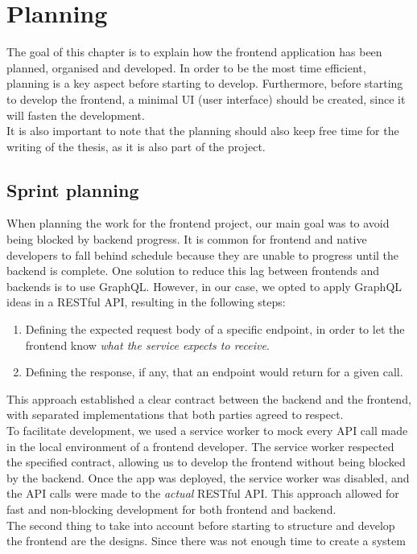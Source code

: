 \documentclass[../memory.tex]{subfiles}
\begin{document}
\chapter{Planning}
The goal of this chapter is to explain how the frontend application has been
planned, organised and developed. In order to be the most time efficient,
planning is a key aspect before starting to develop. Furthermore, before
starting to develop the frontend, a minimal UI (user interface) should be
created, since it will fasten the development.
\\
It is also important to note that the planning should also keep free time for
the writing of the thesis, as it is also part of the project.
\section{Sprint planning}
When planning the work for the frontend project, our main goal was to avoid
being blocked by backend progress. It is common for frontend and native
developers to fall behind schedule because they are unable to progress until the
backend is complete. One solution to reduce this lag between frontends and
backends is to use GraphQL. However, in our case, we opted to apply GraphQL
ideas in a RESTful API, resulting in the following steps:
\begin{enumerate}[label = -]
	\item Defining the expected request body of a specific endpoint, in order to
	      let the frontend know \emph{what the service expects to receive}.
	\item Defining the response, if any, that an endpoint would return for a given call.
\end{enumerate}
This approach established a clear contract between the backend and the frontend,
with separated implementations that both parties agreed to respect.
\\
To facilitate development, we used a service worker to mock every API call made
in the local environment of a frontend developer. The service worker respected
the specified contract, allowing us to develop the frontend without being
blocked by the backend. Once the app was deployed, the service worker was
disabled, and the API calls were made to the \emph{actual} RESTful API. This
approach allowed for fast and non-blocking development for both frontend and
backend.
\\[8pt]
The second thing to take into account before starting to structure and develop
the frontend are the designs. Since there was not enough time to create a system
\end{document}

